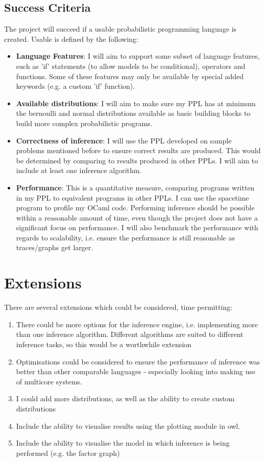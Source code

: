 \subsection*{Success Criteria}

The project will succeed if a usable probabilistic programming language is created. Usable is defined by the following:

\begin{itemize}
	\item \textbf{Language Features}: I will aim to support some subset of language features, such as 'if' statements (to allow models to be conditional), operators and functions. Some of these features may only be available by special added keywords (e.g. a custom 'if' function).
	\item \textbf{Available distributions}: I will aim to make sure my PPL has at minimum the bernoulli and normal distributions available as basic building blocks to build more complex probabilistic programs.
	\item \textbf{Correctness of inference}: I will use the PPL developed on sample problems mentioned before to ensure correct results are produced. This would be determined by comparing to results produced in other PPLs. I will aim to include at least one inference algorithm.
	\item \textbf{Performance}: This is a quantitative measure, comparing programs written in my PPL to equivalent programs in other PPLs. I can use the spacetime program to profile my OCaml code. Performing inference should be possible within a reasonable amount of time, even though the project does not have a significant focus on performance. I will also benchmark the performance with regards to scalability, i.e. ensure the performance is still reasonable as traces/graphs get larger.
\end{itemize}

\section*{Extensions}

There are several extensions which could be considered, time permitting:

\begin{enumerate}
	\item There could be more options for the inference engine, i.e. implementing more than one inference algorithm. Different algorithms are suited to different inference tasks, so this would be a worthwhile extension
	\item Optimisations could be considered to ensure the performance of inference was better than other comparable languages - especially looking into making use of multicore systems.
	\item I could add more distributions, as well as the ability to create custom distributions
	\item Include the ability to visualise results using the plotting module in owl.
	\item Include the ability to visualise the model in which inference is being performed (e.g. the factor graph)
\end{enumerate}


